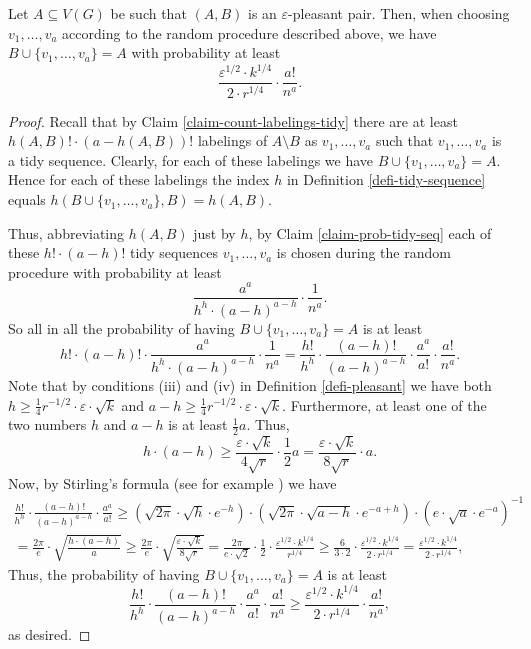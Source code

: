 \begin{corollary}\label{coro-A-pleasant} Let $A\subseteq V(G)$ be such that $(A,B)$ is an $\varepsilon$-pleasant pair. Then, when choosing $v_1,\dots,v_a$ according to the random procedure described above, we have $B\cup \lbrace v_1,\dots,v_a\rbrace=A$ with probability at least
\[\frac{\varepsilon^{1/2}\cdot k^{1/4}}{2\cdot r^{1/4}}\cdot \frac{a!}{n^a}.\]
\end{corollary}
\begin{proof}
Recall that by Claim \ref{claim-count-labelings-tidy} there are at least $h(A,B)!\cdot (a-h(A,B))!$ labelings of $A\setminus B$ as $v_1,\dots,v_a$ such that $v_1,\dots,v_a$ is a tidy sequence.  Clearly, for each of these labelings we have $B\cup \lbrace v_1,\dots,v_a\rbrace=A$. Hence for each of these labelings the index $h$ in Definition \ref{defi-tidy-sequence} equals $h(B\cup \lbrace v_1,\dots,v_a\rbrace,B)=h(A,B)$.

Thus, abbreviating $h(A,B)$ just by $h$, by Claim \ref{claim-prob-tidy-seq} each of these $h!\cdot (a-h)!$ tidy sequences $v_1,\dots,v_a$ is chosen during the random procedure with probability at least
\[\frac{a^a}{h^h\cdot (a-h)^{a-h}}\cdot \frac{1}{n^a}.\]
So all in all the probability of having $B\cup \lbrace v_1,\dots,v_a\rbrace=A$ is at least
\[h!\cdot (a-h)!\cdot \frac{a^a}{h^h\cdot (a-h)^{a-h}}\cdot \frac{1}{n^a}=\frac{h!}{h^h}\cdot \frac{(a-h)!}{(a-h)^{a-h}}\cdot \frac{a^a}{a!}\cdot \frac{a!}{n^a}.\]
Note that by conditions (iii) and (iv) in Definition \ref{defi-pleasant} we have both $h\geq \frac{1}{4}r^{-1/2}\cdot \varepsilon\cdot \sqrt{k}$ and $a-h\geq \frac{1}{4}r^{-1/2}\cdot \varepsilon\cdot \sqrt{k}$. Furthermore, at least one of the two numbers $h$ and $a-h$ is at least $\frac{1}{2}a$. Thus,
\[h\cdot (a-h)\geq \frac{\varepsilon\cdot \sqrt{k}}{4\sqrt{r}} \cdot \frac{1}{2}a=\frac{\varepsilon\cdot \sqrt{k}}{8\sqrt{r}} \cdot a.\]
Now, by Stirling's formula (see for example \cite{robbins}) we have
\begin{multline*}
\frac{h!}{h^h}\cdot \frac{(a-h)!}{(a-h)^{a-h}}\cdot \frac{a^a}{a!}\geq 
\left(\sqrt{2\pi}\cdot \sqrt{h}\cdot e^{-h}\right)\cdot \left(\sqrt{2\pi}\cdot \sqrt{a-h}\cdot e^{-a+h}\right)\cdot \left(e\cdot \sqrt{a}\cdot e^{-a}\right)^{-1}\\
=\frac{2\pi}{e}\cdot \sqrt{\frac{h\cdot (a-h)}{a}}\geq \frac{2\pi}{e}\cdot \sqrt{\frac{\varepsilon\cdot \sqrt{k}}{8\sqrt{r}}}=\frac{2\pi}{e\cdot \sqrt{2}}\cdot \frac{1}{2}\cdot \frac{\varepsilon^{1/2}\cdot k^{1/4}}{r^{1/4}}\geq \frac{6}{3\cdot 2}\cdot  \frac{\varepsilon^{1/2}\cdot k^{1/4}}{2\cdot r^{1/4}}=\frac{\varepsilon^{1/2}\cdot k^{1/4}}{2\cdot r^{1/4}},
\end{multline*}
Thus, the probability of having $B\cup \lbrace v_1,\dots,v_a\rbrace=A$ is at least
\[\frac{h!}{h^h}\cdot \frac{(a-h)!}{(a-h)^{a-h}}\cdot \frac{a^a}{a!}\cdot \frac{a!}{n^a}\geq\frac{\varepsilon^{1/2}\cdot k^{1/4}}{2\cdot r^{1/4}}\cdot \frac{a!}{n^a},\]
as desired.
\end{proof}
